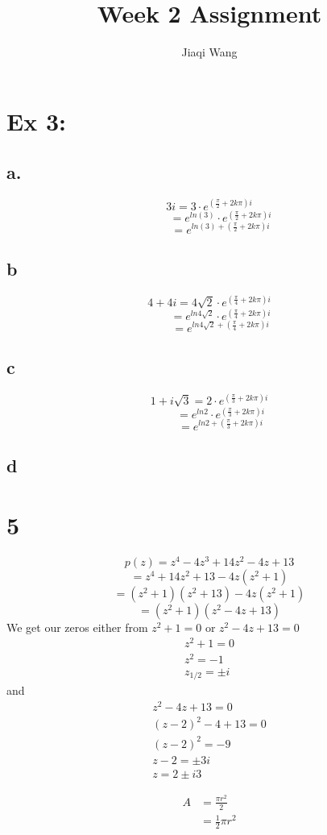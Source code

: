 \documentclass{article}
\title{Week 2 Assignment}
\author{Jiaqi Wang}
\begin{document}
\maketitle

\section*{Ex 3:}
\subsection*{a.}
$$ 3i = 3\cdot e^{\left(\frac{\pi}{2}+2k\pi\right)i} $$
$$\qquad = e^{ln(3)} \cdot e^{\left(\frac{\pi}{2}+2k\pi\right)i}$$
$$\qquad = e^{ln(3) + \left(\frac{\pi}{2} + 2k\pi \right)i}$$
\subsection*{b}
$$4+4i = 4\sqrt{2} \cdot e^{\left(\frac{\pi}{4}+2k\pi\right)i}$$
$$\qquad = e^{ln{4\sqrt{2}}} \cdot e^{\left(\frac{\pi}{4}+2k\pi\right)i}$$
$$\qquad = e^{ln{4\sqrt{2}} + \left(\frac{\pi}{4}+2k\pi\right)i}$$
\subsection*{c}
$$1+i\sqrt{3} = 2 \cdot e^{\left(\frac{\pi}{3}+2k\pi\right)i}$$
$$\qquad = e^{ln{2}} \cdot e^{\left(\frac{\pi}{3}+2k\pi\right)i}$$
$$\qquad = e^{ln{2} + \left(\frac{\pi}{3}+2k\pi\right)i}$$
\subsection*{d}

\section*{5}
$$p(z) = z^4 - 4z^3 + 14z^2 - 4z + 13$$
$$= z^4 +14z^2 + 13 -4z(z^2+1) $$
$$= (z^2+1)(z^2+13) - 4z(z^2+1) $$
$$= (z^2+1)(z^2-4z+13)$$
We get our zeros either from $z^2+1 = 0$ or $z^2-4z+13=0$
\begin{align*}
z^2+1  =  0 \\
z^2  =  -1 \\ 
z_{1/2}  =  \pm i
\end{align*}
and
\begin{align*}
    z^2-4z+13=0 \\
    (z-2)^2 - 4 + 13 = 0 \\
    (z-2)^2 = -9 \\ 
    z-2 = \pm 3i \\ 
    z = 2 \pm i3
\end{align*}

\begin{equation} \label{eq1}
\begin{split}
A & = \frac{\pi r^2}{2} \\
 & = \frac{1}{2} \pi r^2
\end{split}
\end{equation}
\end{document}
